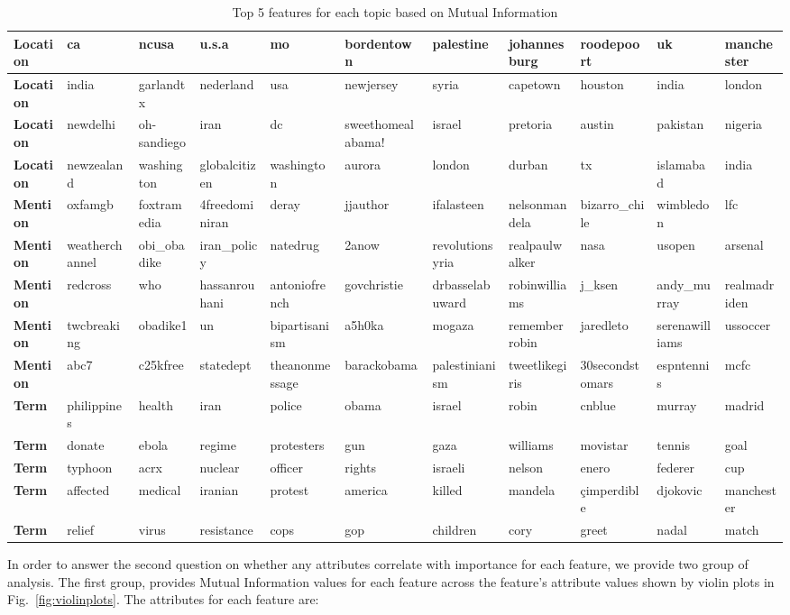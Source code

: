\begin{table}[ht]
{{\begin{tabular}{|l|l|l|l|l|l|l|l|l|l|l|}
\textbf{Location} & ca & ncusa & u.s.a & mo & bordentown & palestine & johannesburg & roodepoort & uk & manchester \\ \hline
\textbf{Location} & india & garlandtx & nederland & usa & newjersey & syria & capetown & houston & india & london \\ \hline
\textbf{Location} & newdelhi & oh-sandiego & iran & dc & sweethomealabama! & israel & pretoria & austin & pakistan & nigeria \\ \hline
\textbf{Location} & newzealand & washington & globalcitizen & washington & aurora & london & durban & tx & islamabad & india \\ \hline \hline
\textbf{Mention} & oxfamgb & foxtramedia & 4freedominiran & deray & jjauthor & ifalasteen & nelsonmandela & bizarro\_chile & wimbledon & lfc \\ \hline
\textbf{Mention} & weatherchannel & obi\_obadike & iran\_policy & natedrug & 2anow & revolutionsyria & realpaulwalker & nasa & usopen & arsenal \\ \hline
\textbf{Mention} & redcross & who & hassanrouhani & antoniofrench & govchristie & drbasselabuward & robinwilliams & j\_ksen & andy\_murray & realmadriden \\ \hline
\textbf{Mention} & twcbreaking & obadike1 & un & bipartisanism & a5h0ka & mogaza & rememberrobin & jaredleto & serenawilliams & ussoccer \\ \hline
\textbf{Mention} & abc7 & c25kfree & statedept & theanonmessage & barackobama & palestinianism & tweetlikegiris & 30secondstomars & espntennis & mcfc \\ \hline \hline
\textbf{Term} & philippines & health & iran & police & obama & israel & robin & cnblue & murray & madrid \\ \hline
\textbf{Term} & donate & ebola & regime & protesters & gun & gaza & williams & movistar & tennis & goal \\ \hline
\textbf{Term} & typhoon & acrx & nuclear & officer & rights & israeli & nelson & enero & federer & cup \\ \hline
\textbf{Term} & affected & medical & iranian & protest & america & killed & mandela & çimperdible & djokovic & manchester \\ \hline
\textbf{Term} & relief & virus & resistance & cops & gop & children & cory & greet & nadal & match \\ \hline
\end{tabular}
}}
\caption{Top 5 features for each topic based on Mutual Information}
\label{table:top10MItopicsLocations}
\end{table}
In order to answer the second question on whether any attributes correlate with importance for each feature, we provide two group of analysis. The first group, provides Mutual Information values for each feature across the feature's attribute values shown by violin plots in Fig.~\ref{fig:violinplots}. The attributes for each feature are:

